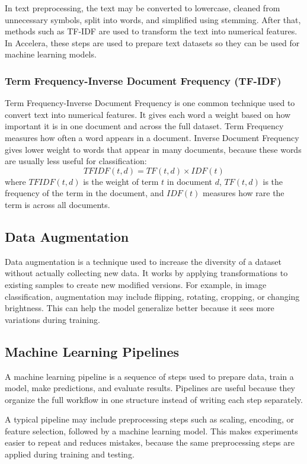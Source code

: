 \documentclass[12pt,a4paper]{report}
\begin{document}
\noindent In text preprocessing, the text may be converted to lowercase, cleaned from
unnecessary symbols, split into words, and simplified using stemming. After that,
methods such as TF-IDF are used to transform the text into numerical features.
In Accelera, these steps are used to prepare text datasets so they can be used
for machine learning models.

\subsubsection{Term Frequency-Inverse Document Frequency (TF-IDF)}
Term Frequency-Inverse Document Frequency is one common technique used
to convert text into numerical features. It gives each word a weight based on
how important it is in one document and across the full dataset. Term Frequency
measures how often a word appears in a document. Inverse Document Frequency gives
lower weight to words that appear in many documents, because these words are
usually less useful for classification:
\[
TFIDF(t,d) = TF(t,d) \times IDF(t)
\]
where $TFIDF(t,d)$ is the weight of term $t$ in document $d$, $TF(t,d)$ is the
frequency of the term in the document, and $IDF(t)$ measures how rare the term
is across all documents.

\subsection{Data Augmentation}
Data augmentation is a technique used to increase the diversity of a dataset
without actually collecting new data. It works by applying transformations to
existing samples to create new modified versions. For example, in image
classification, augmentation may include flipping, rotating, cropping, or
changing brightness. This can help the model generalize better because it sees
more variations during training.

\subsection{Machine Learning Pipelines}
A machine learning pipeline is a sequence of steps used to prepare data, train a
model, make predictions, and evaluate results. Pipelines are useful because they
organize the full workflow in one structure instead of writing each step
separately.

A typical pipeline may include preprocessing steps such as scaling, encoding, or
feature selection, followed by a machine learning model. This makes experiments
easier to repeat and reduces mistakes, because the same preprocessing steps are
applied during training and testing.
\end{document}
